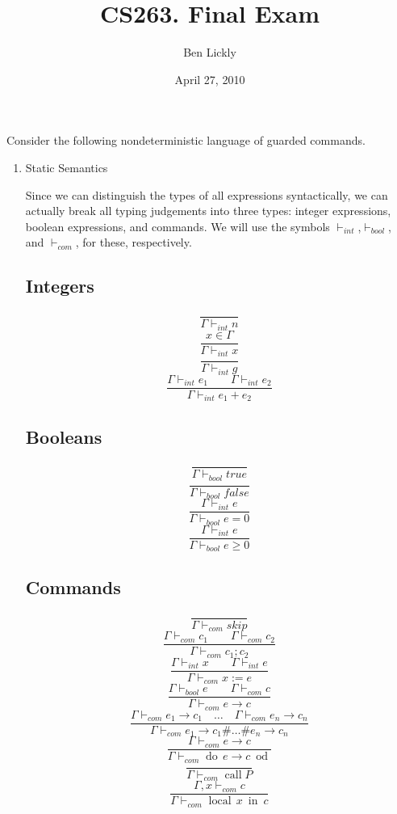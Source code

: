 \documentclass{article}
\title{CS263. Final Exam}
\author{Ben Lickly}
\date{April 27, 2010}
\newcommand{\problem}[1]
{\subsubsection*{} %
\vspace{-16pt} \section{} \vspace{-22pt} \qquad
#1%
\bigskip \bigskip
}
\newcommand{\proves}{\vdash}
\newcommand{\dood}[1]{\operatorname{do}\, #1\ \operatorname{od}}
\newcommand{\callP}{\operatorname{call} P}
\newcommand{\localin}[2]{\operatorname{local}\, #1\ \operatorname{in}\ #2}
\begin{document}
\maketitle

\problem{Consider the following nondeterministic language of guarded commands.
}
\begin{enumerate}
  \item Static Semantics

    Since we can distinguish the types of all expressions syntactically, we can
    actually break all typing judgements into three types: integer expressions,
    boolean expressions, and commands.  We will use the symbols
    $\proves_{int}$,$\proves_{bool}$, and $\proves_{com}$, for these,
    respectively.
\subsection*{Integers}
\[\frac{}
{\Gamma \proves_{int} n}
\]
\[\frac{x \in \Gamma}
{\Gamma \proves_{int} x}
\]
\[\frac{}
{\Gamma \proves_{int} g}
\]
\[\frac{\Gamma \proves_{int} e_1 \qquad \Gamma \proves_{int} e_2}
{\Gamma \proves_{int} e_1 + e_2}
\]

\subsection*{Booleans}
\[\frac{}
{\Gamma \proves_{bool} true}
\]
\[\frac{}
{\Gamma \proves_{bool} false}
\]
\[\frac{\Gamma \proves_{int} e}
{\Gamma \proves_{bool} e = 0}
\]
\[\frac{\Gamma \proves_{int} e}
{\Gamma \proves_{bool} e \ge 0}
\]

\subsection*{Commands}
\[\frac{}
{\Gamma \proves_{com} skip}
\]
\[\frac{\Gamma \proves_{com} c_1 \qquad \Gamma \proves_{com} c_2}
{\Gamma \proves_{com} c_1; c_2}
\]
\[\frac{\Gamma \proves_{int} x \qquad \Gamma \proves_{int} e}
{\Gamma \proves_{com} x := e}
\]
\[\frac{\Gamma \proves_{bool} e \qquad \Gamma \proves_{com} c}
{\Gamma \proves_{com} e \rightarrow c}
\]
\[\frac{\Gamma \proves_{com} e_1 \rightarrow c_1 \quad \dots \quad
        \Gamma \proves_{com} e_n \rightarrow c_n}
{\Gamma \proves_{com} e_1 \rightarrow c_1 \# \dots \# e_n \rightarrow c_n}
\]
\[\frac{\Gamma \proves_{com} e \rightarrow c}
{\Gamma \proves_{com} \dood{e \rightarrow c}}
\]
\[\frac{}
{\Gamma \proves_{com} \callP }
\]
\[\frac{\Gamma,x \proves_{com} c}
{\Gamma \proves_{com} \localin{x}{c}}
\]


\end{enumerate}
\end{document}
